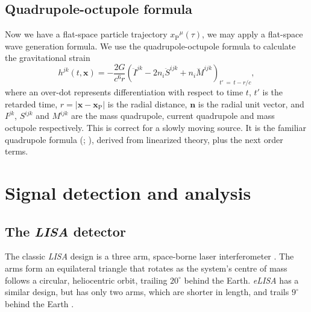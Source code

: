 \documentclass[useAMS,usedcolumn,usegraphicx,usenatbib]{mn2e}
\newcommand{\sub}[1]{\ensuremath{_\mathrm{#1}}}
\begin{document}
\subsection{Quadrupole-octupole formula}

Now we have a flat-space particle trajectory $x\sub{P}^\mu(\tau)$, we may apply a flat-space wave generation formula. We use the quadrupole-octupole formula to calculate the gravitational strain \citep{Bekenstein1973, Press1977, Yunes2008}
\begin{equation}
h^{jk}(t, \boldsymbol{x}) = -\frac{2G}{c^6r}\left(\ddot{I}^{jk} - 2n_i\ddot{S}^{ijk} + n_i\dddot{M}^{ijk}\right)_{t'\, =\, t - r/c},
\label{eq:octupole}
\end{equation}
where an over-dot represents differentiation with respect to time $t$, $t'$ is the retarded time, $r = \left|\boldsymbol{x} - \boldsymbol{x}\sub{P}\right|$ is the radial distance, $\boldsymbol{n}$ is the radial unit vector, and ${I}^{jk}$, ${S}^{ijk}$ and ${M}^{ijk}$ are the mass quadrupole, current quadrupole and mass octupole respectively. This is correct for a slowly moving source. It is the familiar quadrupole formula (\citealt*[section 36.10]{Misner1973}; \citealt[section 17.9]{Hobson2006}), derived from linearized theory, plus the next order terms. 

\section{Signal detection and analysis}\label{sec:Signal}

\subsection{The \textit{LISA} detector}\label{sec:Detector}

The classic \textit{LISA} design is a three arm, space-borne laser interferometer \citep{Bender1998, Danzmann2003}. The arms form an equilateral triangle that rotates as the system's centre of mass follows a circular, heliocentric orbit, trailing $20^{\circ}$ behind the Earth. \textit{eLISA} has a similar design, but  has only two arms, which are shorter in length, and trails $9^{\circ}$ behind the Earth \citep{Jennrich2011}.
\end{document}
